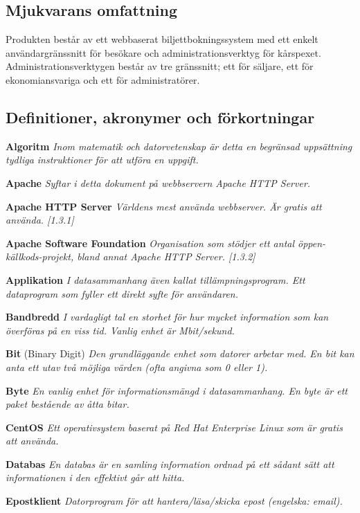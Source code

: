 \documentclass[a4paper, twoside, 11pt, titlepage]{article}
\begin{document}
	\subsection{Mjukvarans omfattning}


	Produkten består av ett webbaserat biljettbokningssystem med ett enkelt användargränssnitt för besökare och administrationsverktyg för kårspexet. Administrationsverktygen består av tre gränssnitt; ett för säljare, ett för ekonomiansvariga och ett för administratörer.

	\subsection{Definitioner, akronymer och förkortningar}


	\textbf{Algoritm} \emph{Inom matematik och datorvetenskap är detta en begränsad uppsättning tydliga instruktioner för att utföra en uppgift.}

	\textbf{Apache} \emph{Syftar i detta dokument på webbservern  Apache HTTP Server.}

	\textbf{Apache HTTP Server} \emph{Världens mest använda webbserver. Är gratis att använda. [1.3.1]}

	\textbf{Apache Software Foundation} \emph{Organisation som stödjer ett antal öppen-källkods-projekt, bland annat Apache HTTP Server. [1.3.2]}

	\textbf{Applikation} \emph{I datasammanhang även kallat tillämpningsprogram. Ett dataprogram som fyller ett direkt syfte för användaren.}

	\textbf{Bandbredd} \emph{I vardagligt tal en storhet för hur mycket information som kan överföras på en viss tid. Vanlig enhet är Mbit/sekund.}

	\textbf{Bit} (Binary Digit) \emph{Den grundläggande enhet som datorer arbetar med. En bit kan anta ett utav två möjliga värden (ofta angivna som 0 eller 1).}

	\textbf{Byte} \emph{En vanlig enhet för informationsmängd i datasammanhang. En byte är ett paket bestående av åtta bitar.}

	\textbf{CentOS} \emph{Ett operativsystem baserat på Red Hat Enterprise Linux som är gratis att använda.}

	\textbf{Databas} \emph{En databas är en samling information ordnad på ett sådant sätt att informationen i den effektivt går att hitta.}

	\textbf{Epostklient} \emph{Datorprogram för att hantera/läsa/skicka epost (engelska: email).}
\end{document}
